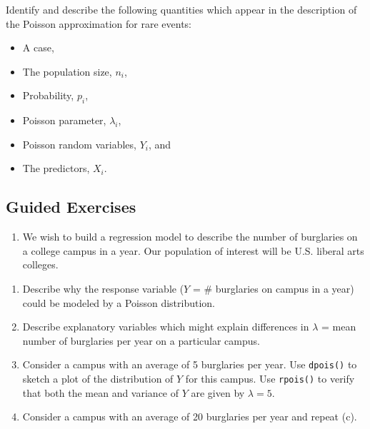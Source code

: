 \documentclass[
]{krantz}
\providecommand{\tightlist}{%
  \setlength{\itemsep}{0pt}\setlength{\parskip}{0pt}}
\begin{document}
Identify and describe the following quantities which appear in the description of the Poisson approximation for rare events:

\begin{itemize}
\tightlist
\item
  A case,
\item
  The population size, \(n_i\),
\item
  Probability, \(p_i\),
\item
  Poisson parameter, \(\lambda_i\),
\item
  Poisson random variables, \(Y_i\), and
\item
  The predictors, \(X_i\).
\end{itemize}

\hypertarget{guided-exercises-2}{%
\subsection{Guided Exercises}\label{guided-exercises-2}}

\begin{enumerate}
\def\labelenumi{\arabic{enumi}.}
\tightlist
\item
  We wish to build a regression model to describe the number of burglaries on a college campus in a year. Our population of interest will be U.S. liberal arts colleges.
\end{enumerate}

\begin{enumerate}
\def\labelenumi{\alph{enumi}.}
\tightlist
\item
  Describe why the response variable (\(Y\) = \# burglaries on campus in a year) could be modeled by a Poisson distribution.
\item
  Describe explanatory variables which might explain differences in \(\lambda\) = mean number of burglaries per year on a particular campus.
\item
  Consider a campus with an average of 5 burglaries per year. Use \texttt{dpois()} to sketch a plot of the distribution of \(Y\) for this campus. Use \texttt{rpois()} to verify that both the mean and variance of \(Y\) are given by \(\lambda=5\).
\item
  Consider a campus with an average of 20 burglaries per year and repeat (c).
\end{enumerate}
\end{document}
